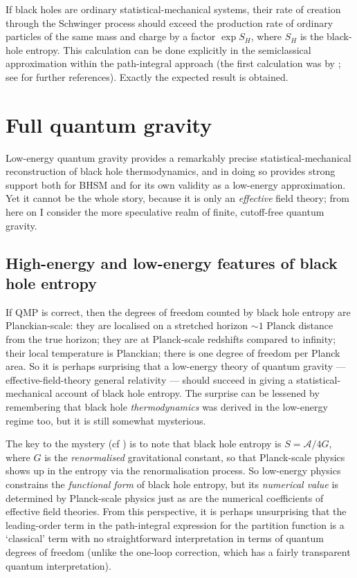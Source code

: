 \documentclass[12pt]{article}
\newcommand{\mc}[1]{\ensuremath{\mathcal{#1}}}
\begin{document}
If black holes are ordinary statistical-mechanical systems, their rate of creation through the Schwinger process should exceed the production rate of ordinary particles of the same mass and charge by a factor $\exp S_H$, where $S_H$ is the black-hole entropy. This calculation can be done explicitly in the semiclassical approximation within the path-integral approach (the first calculation was by ; see  for further references). Exactly the expected result is obtained.

\section{Full quantum gravity}\label{fullquantumgravity}

Low-energy quantum gravity provides a remarkably precise statistical-mechanical reconstruction of black hole thermodynamics, and in doing so provides strong support both for BHSM and for its own validity as a low-energy approximation. Yet it cannot be the whole story, because it is only an \emph{effective} field theory; from here on I consider the more speculative realm of finite, cutoff-free quantum gravity.

\subsection{High-energy and low-energy features of black hole entropy}\label{high-low}

If QMP is correct, then the degrees of freedom counted by black hole entropy are Planckian-scale: they are localised on a stretched horizon $\sim 1$ Planck distance from the true horizon; they are at Planck-scale redshifts compared to infinity; their local temperature is Planckian; there is one degree of freedom per Planck area. So it is perhaps surprising that a low-energy theory of quantum gravity --- effective-field-theory general relativity --- should succeed in giving a statistical-mechanical account of black hole entropy. The surprise can be lessened by remembering that black hole \emph{thermodynamics} was derived in the low-energy regime too, but it is still somewhat mysterious.

The key to the mystery (cf ) is to note that black hole entropy is $S=\mc{A}/4G$, where $G$ is the \emph{renormalised} gravitational constant, so that Planck-scale physics shows up in the entropy via the renormalisation process. So low-energy physics constrains the \emph{functional form} of black hole entropy, but its \emph{numerical value} is determined by Planck-scale physics just as are the numerical coefficients of effective field theories. From this perspective, it is perhaps unsurprising that the leading-order term in the path-integral expression for the partition function is a `classical' term with no straightforward interpretation in terms of quantum degrees of freedom (unlike the one-loop correction, which has a fairly transparent quantum interpretation). 
\end{document}
